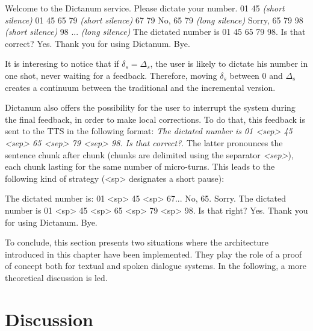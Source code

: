         \begin{dialogue}
       	     Welcome to the Dictanum service. Please dictate your number.
             01 45 \textit{(short silence)}
             01 45
             65 79 \textit{(short silence)}
             67 79
             No, 65 79 \textit{(long silence)}
             Sorry, 65 79
             98 \textit{(short silence)}
             98
             ... \textit{(long silence)}
             The dictated number is 01 45 65 79 98. Is that correct?
             Yes.
             Thank you for using Dictanum. Bye.
        \end{dialogue}

        It is interesing to notice that if $\delta_s = \Delta_s$, the user is likely to dictate his number in one shot, never waiting for a feedback. Therefore, moving $\delta_s$ between 0 and $\Delta_s$ creates a continuum between the traditional and the incremental version.
        
        Dictanum also offers the possibility for the user to interrupt the system during the final feedback, in order to make local corrections. To do that, this feedback is sent to the TTS in the following format: \textit{The dictated number is 01 <sep> 45 <sep> 65 <sep> 79 <sep> 98. Is that correct?}. The latter pronounces the sentence chunk after chunk (chunks are delimited using the separator \textit{<sep>}), each chunk lasting for the same number of micro-turns. This leads to the following kind of strategy (<sp> designates a short pause):
        
        \begin{dialogue}
             The dictated number is: 01 <sp> 45 <sp> 67...
             No, 65.
             Sorry. The dictated number is 01 <sp> 45 <sp> 65 <sp> 79 <sp> 98. Is that right?
             Yes.
             Thank you for using Dictanum. Bye.
        \end{dialogue}

        To conclude, this section presents two situations where the architecture introduced in this chapter have been implemented. They play the role of a proof of concept both for textual and spoken dialogue systems. In the following, a more theoretical discussion is led.
    
\section{Discussion}

